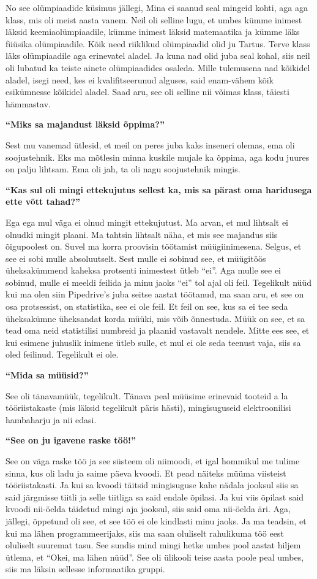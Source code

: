 No see olümpiaadide küsimus jällegi, Mina ei saanud seal mingeid kohti, aga aga klass, mis oli meist aasta vanem.
Neil oli selline lugu, et umbes kümme inimest läksid keemiaolümpiaadile, kümme inimest läksid matemaatika ja kümme läks füüsika olümpiaadile. Kõik need riiklikud olümpiaadid olid ju Tartus. Terve klass läks olümpiaadile aga erinevatel aladel. Ja kuna nad olid juba seal kohal, siis neil oli lubatud  ka teiste ainete olümpiaadides osaleda. Mille tulemusena nad kõikidel aladel, isegi need, kes ei kvalifitseerunud alguses, said enam-vähem kõik esikümnesse kõikidel aladel. Saad aru, see oli selline nii võimas klass, täiesti hämmastav.

\textbf{\enquote{Miks sa majandust läksid õppima?}}

Sest mu vanemad ütlesid, et meil on peres juba kaks inseneri olemas, ema oli soojustehnik. Eks ma mõtlesin minna kuskile mujale ka õppima, aga  kodu juures on palju lihtsam. Ema oli jah, ta oli nagu soojustehnik mingis.

\textbf{\enquote{Kas sul oli mingi ettekujutus sellest ka, mis sa pärast oma haridusega ette võtt tahad?}}

Ega ega mul väga ei olnud mingit ettekujutust. Ma arvan, et mul lihtsalt ei olnudki mingit plaani. Ma tahtsin lihtsalt näha, et mis see majandus siis õigupoolest on. Suvel ma korra proovisin töötamist müügiinimesena. Selgus, et see ei sobi mulle absoluutselt. Sest mulle ei sobinud see, et müügitöös üheksakümmend kaheksa protsenti inimestest ütleb \enquote{ei}. Aga mulle see ei sobinud, mulle ei meeldi feilida ja minu jaoks \enquote{ei} tol ajal oli feil. Tegelikult nüüd kui ma olen siin Pipedrive's juba seitse aastat töötanud, ma saan aru, et see on osa protsessist, on statistika, see ei ole feil. Et feil on see, kus sa ei tee seda üheksakümne üheksandat korda müüki, mis võib õnnestuda. Müük on see, et sa tead oma neid statistilisi numbreid ja plaanid vastavalt nendele. Mitte ees see, et kui esimene juhuslik inimene ütleb sulle, et mul ei ole seda teenust vaja, siis sa oled feilinud. Tegelikult ei ole.

\textbf{\enquote{Mida sa müüsid?}}

See oli tänavamüük, tegelikult. Tänava peal müüsime erinevaid tooteid a la tööriistakaste (mis läksid tegelikult päris hästi), mingisuguseid elektroonilisi hambaharju ja nii edasi.

\textbf{\enquote{See on ju igavene raske töö!}}

See on väga raske töö ja  see süsteem oli niimoodi, et igal hommikul me tulime sinna, kus oli ladu ja saime päeva kvoodi. Et pead näiteks müüma viisteist tööriistakasti. Ja kui sa kvoodi täitsid mingisuguse kahe nädala jooksul siis sa said järgmisse tiitli ja selle tiitliga sa said endale õpilasi. Ja kui viis õpilast said kvoodi nii-öelda täidetud mingi aja jooksul, siis said oma nii-öelda äri. Aga, jällegi, õppetund oli see, et see töö ei ole kindlasti minu jaoks. Ja ma teadsin, et kui ma lähen programmeerijaks, siis ma saan oluliselt rahulikuma töö eest oluliselt suuremat tasu. See sundis mind mingi hetke umbes pool aastat hiljem ütlema, et \enquote{Okei, ma lähen nüüd}. See oli ülikooli teise aasta poole peal umbes, siis ma läksin sellesse informaatika gruppi.

